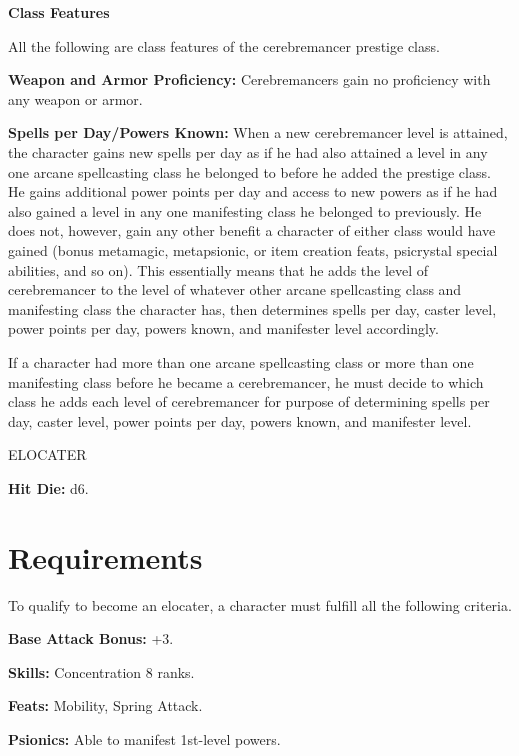 \documentclass{article}
\begin{document}
\vspace{12pt}
\textbf{Class Features}

All the following are class features of the cerebremancer prestige class.

\textbf{Weapon and Armor Proficiency:} Cerebremancers gain no proficiency with 
any weapon or armor.

\textbf{Spells per Day/Powers Known:} When a new cerebremancer level is attained, 
the character gains new spells per day as if he had also attained a level in any 
one arcane spellcasting class he belonged to before he added the prestige class. 
He gains additional power points per day and access to new powers as if he had 
also gained a level in any one manifesting class he belonged to previously. He 
does not, however, gain any other benefit a character of either class would have 
gained (bonus metamagic, metapsionic, or item creation feats, psicrystal special 
abilities, and so on). This essentially means that he adds the level of cerebremancer 
to the level of whatever other arcane spellcasting class and manifesting class 
the character has, then determines spells per day, caster level, power points per 
day, powers known, and manifester level accordingly.

If a character had more than one arcane spellcasting class or more than one manifesting 
class before he became a cerebremancer, he must decide to which class he adds each 
level of cerebremancer for purpose of determining spells per day, caster level, 
power points per day, powers known, and manifester level.

\vspace{12pt}
{\LARGE{}ELOCATER}

\textbf{Hit Die:} d6.

\vspace{12pt}
\section*{\textbf{Requirements}}

To qualify to become an elocater, a character must fulfill all the following criteria.

\textbf{Base Attack Bonus:} +3.

\textbf{Skills:} Concentration 8 ranks.

\textbf{Feats:} Mobility, Spring Attack.

\textbf{Psionics:} Able to manifest 1st-level powers.

\vspace{12pt}
\end{document}
